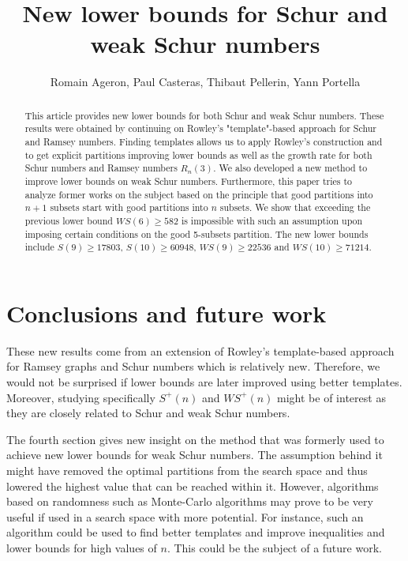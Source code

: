 \documentclass{article}
\title{New lower bounds for Schur and weak Schur numbers}
\author{Romain Ageron, Paul Casteras, Thibaut Pellerin, Yann Portella}
\newtheorem{computational theorem}{Computational Theorem}[section]
\newcommand{\WS}{\mathit{WS}}
\begin{document}
\maketitle

\begin{abstract}

This article provides new lower bounds for both Schur and weak Schur numbers. These results were obtained by 
continuing on Rowley's "template"-based approach for Schur and Ramsey numbers. Finding templates allows us to 
apply Rowley's construction and to get explicit partitions improving lower bounds as well as the growth rate for 
both Schur numbers and Ramsey numbers \(R_n(3)\). We also developed a new method to improve lower bounds on 
weak Schur numbers. Furthermore, this paper tries to analyze former works on the subject based on the principle 
that good partitions into \(n+1\) subsets start with good partitions into \(n\) subsets. We show that exceeding the 
previous lower bound \(\WS (6) \geqslant 582\) is impossible with such an assumption upon imposing certain conditions 
on the good 5-subsets partition. The new lower bounds include \(S(9) \geqslant 17803\), \(S(10) \geqslant 60948\),
\(\WS (9) \geqslant 22536 \) and \(\WS (10) \geqslant 71214 \).

\end{abstract}




% 








\section{Conclusions and future work}

\qquad These new results come from an extension of Rowley's template-based approach for Ramsey graphs and 
Schur numbers which is relatively new. Therefore, we would not be surprised if lower bounds are later improved 
using better templates. Moreover, studying specifically \(S^+(n)\) and \(\WS^+(n)\) might be of interest as they
 are closely related to Schur and weak Schur numbers.

\par
The fourth section gives new insight on the method that was formerly used to achieve new lower bounds for weak 
Schur numbers. The assumption behind it might have removed the optimal partitions from the search space and thus 
lowered the highest value that can be reached within it. However, algorithms based on randomness such as 
Monte-Carlo algorithms may prove to be very useful if used in a search space with more potential. For instance, such 
an algorithm could be used to find better templates and improve inequalities and lower bounds for high values of \(n\). 
This could be the subject of a future work.
\end{document}
